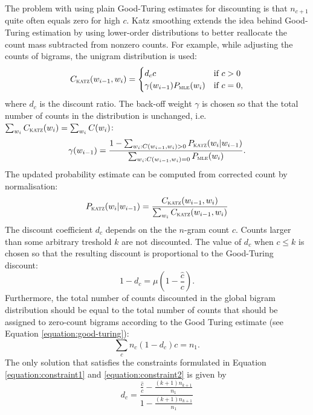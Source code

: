 	The problem with using plain Good-Turing estimates for discounting is that $n_{c+1}$ quite often equals zero for high $c$. Katz smoothing extends the idea behind Good-Turing estimation by using lower-order distributions to better reallocate the count mass subtracted from nonzero counts. For example, while adjusting the counts of bigrams, the unigram distribution is used: 
	\begin{equation}
		C_{\textsc{katz}}(w_{i-1}, w_{i})=
		\begin{cases}
			d_{c}c & \text{if } c>0 \\
			\gamma(w_{i-1})P_{\textsc{mle}}(w_{i}) & \text{if } c=0,
		\end{cases}
	\end{equation}
	where $d_{c}$ is the discount ratio. The back-off weight $\gamma$ is chosen so that the total number of counts in the distribution is unchanged, i.e. $\sum_{w_{i}}C_{\textsc{katz}}(w_{i})=\sum_{w_{i}}C(w_{i})$:
	\begin{equation}
		\gamma(w_{i-1})=\frac{1-\sum_{w_{i}: C(w_{i-1}, w_{i})>0}P_{\textsc{katz}}(w_{i}|w_{i-1})}{\sum_{w_{i}: C(w_{i-1}, w_{i})=0}P_{\textsc{mle}}(w_{i})}.
	\end{equation}
	The updated probability estimate can be computed from corrected count by normalisation:
	\begin{equation}
		P_{\textsc{katz}}(w_{i}|w_{i-1})=\frac{C_{\textsc{katz}}(w_{i-1}, w_{i})}{\sum_{w_{i}}C_{\textsc{katz}}(w_{i-1}, w_{i})}
	\end{equation}
	The discount coefficient $d_{c}$ depends on the the $n$-gram count $c$. Counts larger than some arbitrary treshold $k$ are not discounted. The value of $d_{c}$ when $c\leq k$ is chosen so that the resulting discount is proportional to the Good-Turing discount: 
	\begin{equation}
		1-d_{c}=\mu(1-\frac{\hat{c}}{c}).
		\label{equation:constraint1}
	\end{equation}
	Furthermore, the total number of counts discounted in the global bigram distribution should be equal to the total number of counts that should be assigned to zero-count bigrams according to the Good Turing estimate (see Equation \ref{equation:good-turing}):
	\begin{equation}
		\sum_{c}n_{c}(1-d_{c})c=n_{1}.
		\label{equation:constraint2}
	\end{equation}
	The only solution that satisfies the constraints formulated in Equation \ref{equation:constraint1} and \ref{equation:constraint2} is given by
	\begin{equation}
		d_{c}=\frac{\frac{\hat{c}}{c}-\frac{(k+1)n_{k+1}}{n_{1}}}{1-\frac{(k+1)n_{k+1}}{n_{1}}}
		\label{equation:dc}
	\end{equation}

